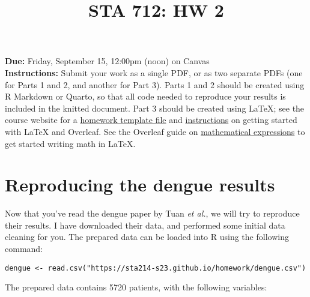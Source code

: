 \documentclass[11pt]{article}
\title{STA 712: HW 2}
\author{}
\date{}
\begin{document}
\maketitle

\noindent \textbf{Due:} Friday, September 15, 12:00pm (noon) on Canvas\\

\noindent \textbf{Instructions:} Submit your work as a single PDF, or as two separate PDFs (one for Parts 1 and 2, and another for Part 3). Parts 1 and 2 should be created using R Markdown or Quarto, so that all code needed to reproduce your results is included in the knitted document. Part 3 should be created using LaTeX; see the course website for a \href{https://sta712-f23.github.io/homework/hw_template.tex}{homework template file} and \href{https://sta712-f23.github.io/homework/latex_instructions/}{instructions} on getting started with LaTeX and Overleaf. See the Overleaf guide on \href{https://www.overleaf.com/learn/latex/Mathematical_expressions}{mathematical expressions} to get started writing math in LaTeX.

\section{Reproducing the dengue results}

Now that you've read the dengue paper by Tuan \textit{et al.}, we will try to reproduce their results. I have downloaded their data, and performed some initial data cleaning for you. The prepared data can be loaded into R using the following command:

\begin{verbatim}
dengue <- read.csv("https://sta214-s23.github.io/homework/dengue.csv")
\end{verbatim}

\noindent The prepared data contains 5720 patients, with the following variables:
\end{document}
